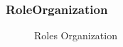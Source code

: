 \documentclass[paper=letter, fontsize=12pt]{article}
\begin{document}
\subsubsection{RoleOrganization}
\begin{figure}[H]
  \begin{center}
    \caption{Roles Organization}
    \label{fig:roles_org}
  \end{center}
\end{figure}
\end{document}
